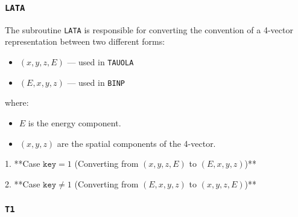 \documentclass[12pt]{article}
\begin{document}
\subsubsection{\texttt{LATA}}

The subroutine \texttt{LATA} is responsible for converting the convention of a 4-vector representation between two different forms:
\begin{itemize}
    \item \((x, y, z, E)\) — used in \texttt{TAUOLA}
    \item \((E, x, y, z)\) — used in \texttt{BINP}
\end{itemize}
where:
\begin{itemize}
    \item \( E \) is the energy component.
    \item \( (x, y, z) \) are the spatial components of the 4-vector.
\end{itemize}

 
1. **Case \( \texttt{key} = 1 \) (Converting from \((x,y,z,E)\) to \((E,x,y,z)\))**  
   
2. **Case \( \texttt{key} \neq 1 \) (Converting from \((E,x,y,z)\) to \((x,y,z,E)\))**  
   

\subsubsection{\texttt{T1}}
\end{document}
